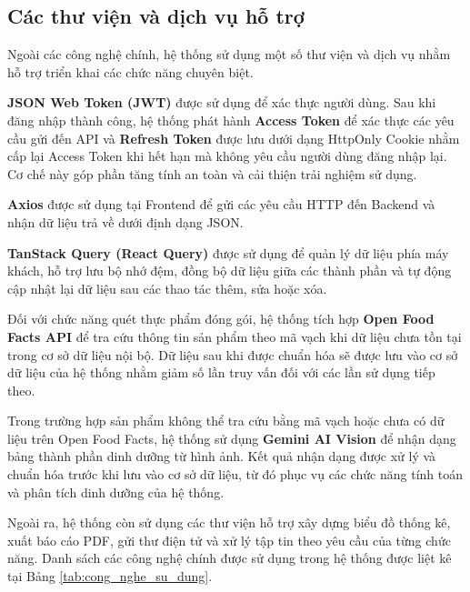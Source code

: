 \documentclass[12pt, a4paper]{report}
\begin{document}
\subsection{Các thư viện và dịch vụ hỗ trợ}Ngoài các công nghệ chính, hệ thống sử dụng một số thư viện và dịch vụ nhằm hỗ trợ triển khai các chức năng chuyên biệt.

\textbf{JSON Web Token (JWT)} được sử dụng để xác thực người dùng. Sau khi đăng nhập thành công, hệ thống phát hành \textbf{Access Token} để xác thực các yêu cầu gửi đến API và \textbf{Refresh Token} được lưu dưới dạng HttpOnly Cookie nhằm cấp lại Access Token khi hết hạn mà không yêu cầu người dùng đăng nhập lại. Cơ chế này góp phần tăng tính an toàn và cải thiện trải nghiệm sử dụng.

\textbf{Axios} được sử dụng tại Frontend để gửi các yêu cầu HTTP đến Backend và nhận dữ liệu trả về dưới định dạng JSON.

\textbf{TanStack Query (React Query)} được sử dụng để quản lý dữ liệu phía máy khách, hỗ trợ lưu bộ nhớ đệm, đồng bộ dữ liệu giữa các thành phần và tự động cập nhật lại dữ liệu sau các thao tác thêm, sửa hoặc xóa.

Đối với chức năng quét thực phẩm đóng gói, hệ thống tích hợp \textbf{Open Food Facts API} để tra cứu thông tin sản phẩm theo mã vạch khi dữ liệu chưa tồn tại trong cơ sở dữ liệu nội bộ. Dữ liệu sau khi được chuẩn hóa sẽ được lưu vào cơ sở dữ liệu của hệ thống nhằm giảm số lần truy vấn đối với các lần sử dụng tiếp theo.

Trong trường hợp sản phẩm không thể tra cứu bằng mã vạch hoặc chưa có dữ liệu trên Open Food Facts, hệ thống sử dụng \textbf{Gemini AI Vision} để nhận dạng bảng thành phần dinh dưỡng từ hình ảnh. Kết quả nhận dạng được xử lý và chuẩn hóa trước khi lưu vào cơ sở dữ liệu, từ đó phục vụ các chức năng tính toán và phân tích dinh dưỡng của hệ thống.

Ngoài ra, hệ thống còn sử dụng các thư viện hỗ trợ xây dựng biểu đồ thống kê, xuất báo cáo PDF, gửi thư điện tử và xử lý tập tin theo yêu cầu của từng chức năng. Danh sách các công nghệ chính được sử dụng trong hệ thống được liệt kê tại Bảng \ref{tab:cong_nghe_su_dung}.
\end{document}
